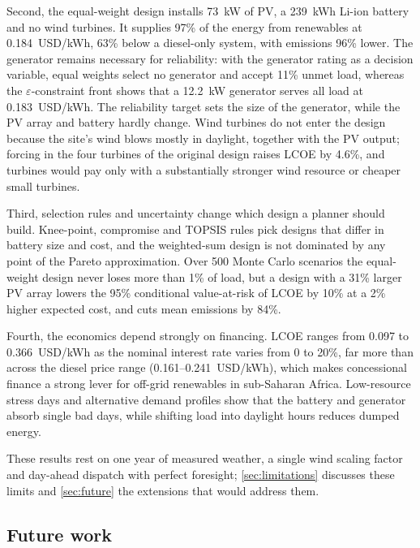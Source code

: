 \documentclass[final,3p,times]{elsarticle}
\begin{document}
Second, the equal-weight design installs 73~kW of PV, a 239~kWh Li-ion battery and no wind turbines. It supplies 97\% of the energy from renewables at 0.184~USD/kWh, 63\% below a diesel-only system, with emissions 96\% lower. The generator remains necessary for reliability: with the generator rating as a decision variable, equal weights select no generator and accept 11\% unmet load, whereas the $\varepsilon$-constraint front shows that a 12.2~kW generator serves all load at 0.183~USD/kWh. The reliability target sets the size of the generator, while the PV array and battery hardly change. Wind turbines do not enter the design because the site's wind blows mostly in daylight, together with the PV output; forcing in the four turbines of the original design raises LCOE by 4.6\%, and turbines would pay only with a substantially stronger wind resource or cheaper small turbines.

Third, selection rules and uncertainty change which design a planner should build. Knee-point, compromise and TOPSIS rules pick designs that differ in battery size and cost, and the weighted-sum design is not dominated by any point of the Pareto approximation. Over 500 Monte Carlo scenarios the equal-weight design never loses more than 1\% of load, but a design with a 31\% larger PV array lowers the 95\% conditional value-at-risk of LCOE by 10\% at a 2\% higher expected cost, and cuts mean emissions by 84\%.

Fourth, the economics depend strongly on financing. LCOE ranges from 0.097 to 0.366~USD/kWh as the nominal interest rate varies from 0 to 20\%, far more than across the diesel price range (0.161--0.241~USD/kWh), which makes concessional finance a strong lever for off-grid renewables in sub-Saharan Africa. Low-resource stress days and alternative demand profiles show that the battery and generator absorb single bad days, while shifting load into daylight hours reduces dumped energy.

These results rest on one year of measured weather, a single wind scaling factor and day-ahead dispatch with perfect foresight; \cref{sec:limitations} discusses these limits and \cref{sec:future} the extensions that would address them.

\subsection{Future work \label{sec:future}}
\end{document}

